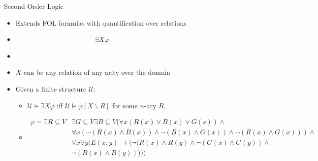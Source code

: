 \documentclass[usenames,dvipsnames]{beamer}
\newcommand{\cU}{\mathcal{U}}
\begin{document}
\begin{frame}{Second Order Logic}
    \begin{itemize}
        \item Extends FOL formulas with quantification over relations
        \item[] ~~~~~~~~~~~~~~~~~~~~~~~$\exists X\varphi$
        \item[] 
        \item $X$ can be any relation of any arity over the domain
        \item Given a finite structure $\cU$:
        \begin{itemize}
            \item $\cU\vDash\exists X\varphi$ iff $\cU\vDash\varphi[X\backslash R]$ for some $n$-ary $R$.
            \item[] \begin{align*}
                \varphi =  \exists R\subseteq V&\exists G\subseteq V\exists B\subseteq V (\forall x (R(x)\vee B(x)\vee G(s))\wedge\\
                                                &\forall x (\neg (R(x)\wedge B(x))\wedge\neg(B(x)\wedge G(x))\wedge\neg(R(x)\wedge G(x)))\wedge\\
                                                &\forall x\forall y(E(x,y)\rightarrow(\neg(R(x)\wedge R(y)\wedge\neg(G(x)\wedge G(y))\wedge\\
                                                                                        &\neg(B(x)\wedge B(y)))))
                \end{align*}
        \end{itemize}
    \end{itemize}
\end{frame}
\end{document}

